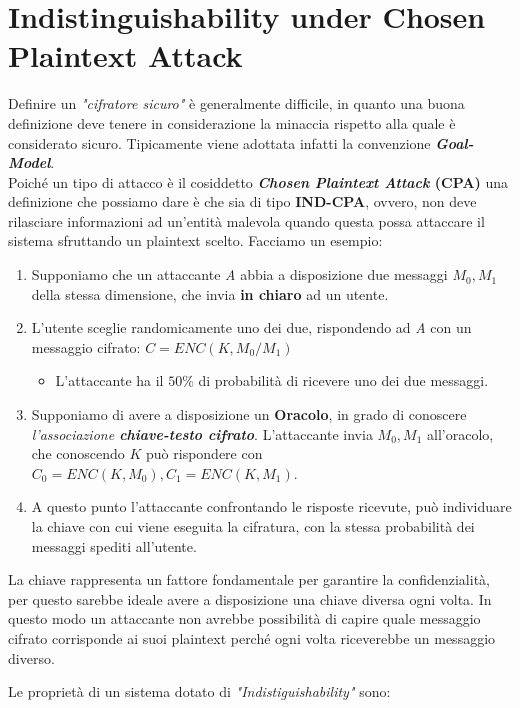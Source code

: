 \section{Indistinguishability under Chosen Plaintext Attack}
Definire un \emph{"cifratore sicuro"} è generalmente difficile, in quanto una buona definizione deve tenere in considerazione la minaccia rispetto alla quale è considerato sicuro. Tipicamente viene adottata infatti la convenzione \textit{\textbf{Goal-Model}}.\\
Poiché un tipo di attacco è il cosiddetto \textbf{\textit{Chosen Plaintext Attack} (CPA)} una definizione che possiamo dare è che sia di tipo \textbf{IND-CPA}, ovvero, non deve rilasciare informazioni ad un'entità malevola quando questa possa attaccare il sistema sfruttando un plaintext scelto. Facciamo un esempio:
\begin{enumerate}
    \item Supponiamo che un attaccante \textit{A} abbia a disposizione due messaggi $M_0,M_1$ della stessa dimensione, che invia \textbf{in chiaro} ad un utente.
    \item L'utente sceglie randomicamente uno dei due, rispondendo ad \textit{A} con un messaggio cifrato: $C=ENC(K,M_0/M_1)$
    \begin{itemize}
        \item L'attaccante ha il $50\%$ di probabilità di ricevere uno dei due messaggi.
    \end{itemize}
    \item Supponiamo di avere a disposizione un \textbf{Oracolo}, in grado di conoscere \textit{l'associazione \textbf{chiave-testo cifrato}}. L'attaccante invia $M_0,M_1$ all'oracolo, che conoscendo $K$ può rispondere con $C_0=ENC(K,M_0),C_1=ENC(K,M_1)$.
    \item A questo punto l'attaccante confrontando le risposte ricevute, può individuare la chiave con cui viene eseguita la cifratura, con la stessa probabilità dei messaggi spediti all'utente.
\end{enumerate}
\begin{remark}
La chiave rappresenta un fattore fondamentale per garantire la confidenzialità, per questo sarebbe ideale avere a disposizione una chiave diversa ogni volta. In questo modo un attaccante non avrebbe possibilità di capire quale messaggio cifrato corrisponde ai suoi plaintext perché ogni volta riceverebbe un messaggio diverso.
\end{remark}
Le proprietà di un sistema dotato di \textit{"Indistiguishability"} sono:
